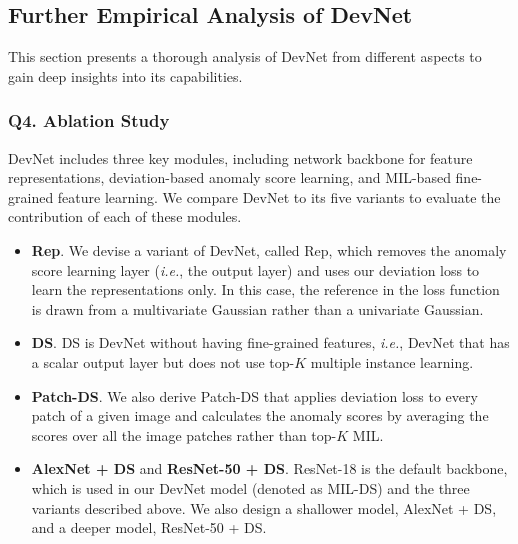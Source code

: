 \documentclass[10pt,journal,compsoc]{IEEEtran}
\newcommand{\ie}{\textit{i.e.}}
\begin{document}
\subsection{Further Empirical Analysis of DevNet }\label{subsec:ablation}

This section presents a thorough analysis of DevNet from different aspects to gain deep insights into its capabilities.

\subsubsection{Q4. Ablation Study}
DevNet includes three key modules, including network backbone for feature representations, deviation-based anomaly score learning, and MIL-based fine-grained feature learning. We compare DevNet to its five variants to evaluate the contribution of each of these modules.

\begin{itemize}
    \item \textbf{Rep}. We devise a variant of DevNet, called Rep, which removes the anomaly score learning layer (\ie, the output layer) and uses our deviation loss to learn the representations only. In this case, the reference in the loss function is drawn from a multivariate Gaussian rather than a univariate Gaussian.
    \item \textbf{DS}. DS is DevNet without having fine-grained features, \ie, DevNet that has a scalar output layer but does not use top-$K$ multiple instance learning.
    \item \textbf{Patch-DS}. We also derive Patch-DS that applies deviation loss to every patch of a given image and calculates the anomaly scores by averaging the scores over all the image patches rather than top-$K$ MIL.
    \item \textbf{AlexNet + DS} and \textbf{ResNet-50 + DS}. ResNet-18 is the default backbone, which is used in our DevNet model (denoted as MIL-DS) and the three variants described above. We also design a shallower model, AlexNet + DS, and a deeper model, ResNet-50 + DS.
\end{itemize}
\end{document}
